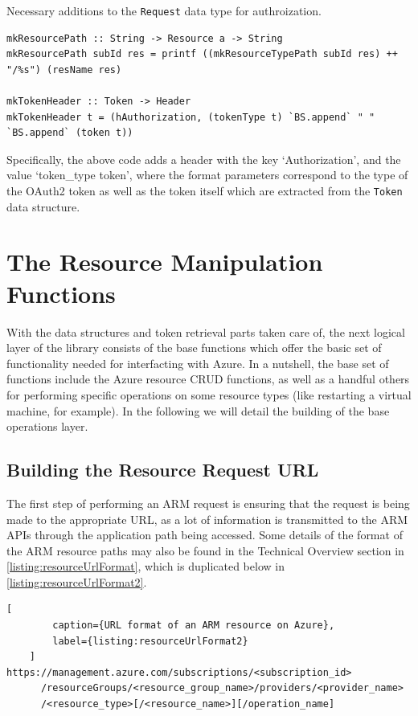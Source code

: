 \documentclass[11pt]{report}
\begin{document}
\begin{listing}[H]
\caption{Necessary additions to the \texttt{Request} data type for authroization.}
\label{listing:authorizationHeaderHaskell}
\begin{verbatim}
mkResourcePath :: String -> Resource a -> String
mkResourcePath subId res = printf ((mkResourceTypePath subId res) ++ "/%s") (resName res)

mkTokenHeader :: Token -> Header
mkTokenHeader t = (hAuthorization, (tokenType t) `BS.append` " " `BS.append` (token t))
\end{verbatim}
\end{listing}

Specifically, the above code adds a header with the key `Authorization', and
the value `token\_type token', where the format parameters correspond to
the type of the OAuth2 token as well as the token itself which are extracted
from the \texttt{Token} data structure.

\section{The Resource Manipulation Functions}

With the data structures and token retrieval parts taken care of, the next
logical layer of the library consists of the base functions which offer the
basic set of functionality needed for interfacting with Azure. In a nutshell,
the base set of functions include the Azure resource CRUD functions, as well as
a handful others for performing specific operations on some resource types (like
restarting a virtual machine, for example). In the following we will detail the
building of the base operations layer.

\subsection{Building the Resource Request URL}

The first step of performing an ARM request is ensuring that the request is
being made to the appropriate URL, as a lot of information is transmitted to
the ARM APIs through the application path being accessed. Some details of
the format of the ARM resource paths may also be found in the Technical Overview
section in \autoref{listing:resourceUrlFormat}, which is duplicated below in
\autoref{listing:resourceUrlFormat2}.

\begin{lstlisting}[
        caption={URL format of an ARM resource on Azure},
        label={listing:resourceUrlFormat2}
    ]
https://management.azure.com/subscriptions/<subscription_id>
      /resourceGroups/<resource_group_name>/providers/<provider_name>
      /<resource_type>[/<resource_name>][/operation_name]
\end{lstlisting}
\end{document}
